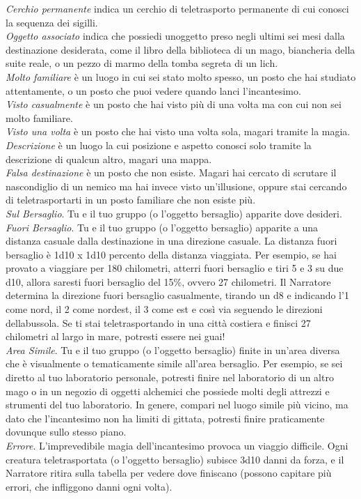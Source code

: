 \begin{multicols}{2}

\textit{Cerchio permanente} indica un cerchio di teletrasporto permanente di cui conosci la sequenza dei sigilli.\\
\textit{Oggetto associato} indica che possiedi unoggetto preso negli ultimi sei mesi dalla destinazione desiderata, come il libro della biblioteca di un mago, biancheria della suite reale, o un pezzo di marmo della tomba segreta di un lich.\\
\textit{Molto familiare} è un luogo in cui sei stato molto spesso, un posto che hai studiato attentamente, o un posto che puoi vedere quando lanci l'incantesimo.\\
\textit{Visto casualmente} è un posto che hai visto più di una volta ma con cui non sei molto familiare. \\
\textit{Visto una volta} è un posto che hai visto una volta sola, magari tramite la magia.\\ \textit{Descrizione} è un luogo la cui posizione e aspetto conosci solo tramite la descrizione di  qualcun altro, magari una mappa.\\
\textit{Falsa destinazione} è un posto che non esiste. Magari hai cercato di scrutare il nascondiglio di un nemico ma hai invece visto un'illusione, oppure stai cercando di teletrasportarti in un posto familiare che non esiste più. \\
\textit{Sul Bersaglio}. Tu e il tuo gruppo (o l’oggetto bersaglio) apparite dove desideri.\\
\textit{Fuori Bersaglio}. Tu e il tuo gruppo (o l’oggetto bersaglio) apparite a una distanza casuale dalla destinazione in una direzione casuale. La distanza fuori bersaglio è 1d10 x 1d10 percento della distanza viaggiata. Per esempio, se hai provato a viaggiare per 180 chilometri, atterri fuori bersaglio e tiri 5 e 3 su due d10, allora saresti fuori bersaglio del 15\%, ovvero 27 chilometri. Il Narratore determina la direzione fuori bersaglio casualmente, tirando un d8 e indicando l’1 come nord, il 2 come nordest, il 3 come est e così via seguendo le direzioni dellabussola. Se ti stai teletrasportando in una città costiera e finisci 27 chilometri al largo in mare, potresti essere nei guai!\\
\textit{Area Simile}. Tu e il tuo gruppo (o l’oggetto bersaglio) finite in un'area diversa che è visualmente o tematicamente simile all'area bersaglio. Per esempio, se sei diretto al tuo laboratorio personale, potresti finire  nel laboratorio di un altro mago o in un negozio di oggetti alchemici che possiede molti degli attrezzi e strumenti del tuo laboratorio. In genere, compari nel luogo simile più vicino, ma dato che l'incantesimo non ha limiti di gittata, potresti finire praticamente dovunque sullo stesso piano.\\
\textit{Errore}. L’imprevedibile magia dell'incantesimo provoca un viaggio difficile. Ogni creatura teletrasportata (o l’oggetto bersaglio) subisce 3d10 danni da forza, e il Narratore ritira sulla tabella per vedere dove finiscano (possono capitare più errori, che infliggono danni ogni
volta).


\end{multicols}
